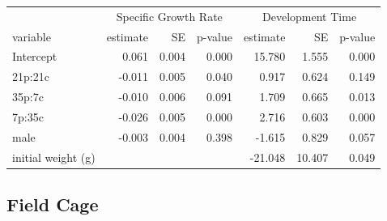 \documentclass[
]{article}
\begin{document}
\begin{tbl}

\begin{minipage}{\linewidth}

\begingroup
\fontsize{12.0pt}{14.4pt}\selectfont
\begin{longtable*}{lrrrrrr}
\toprule
 &  &  \\ 
\cmidrule(lr){2-4} \cmidrule(lr){5-7}
variable & estimate & SE & p-value & estimate & SE & p-value \\ 
\midrule\addlinespace[2.5pt]
Intercept & 0.061 & 0.004 & 0.000 & 15.780 & 1.555 & 0.000 \\ 
21p:21c & -0.011 & 0.005 & 0.040 & 0.917 & 0.624 & 0.149 \\ 
35p:7c & -0.010 & 0.006 & 0.091 & 1.709 & 0.665 & 0.013 \\ 
7p:35c & -0.026 & 0.005 & 0.000 & 2.716 & 0.603 & 0.000 \\ 
male & -0.003 & 0.004 & 0.398 & -1.615 & 0.829 & 0.057 \\ 
initial weight (g) &  &  &  & -21.048 & 10.407 & 0.049 \\ 
\bottomrule
\end{longtable*}
\endgroup

\end{minipage}%

\caption{\label{tbl-field-population-no-choice-model}\emph{C.
terminifera} physiological performance (specific growth rate and
development time) when constrained to specific diets with varying
protein and carbohydrate content. SE: standard error. Posthoc
comparisons for both physiological performance metrics can be seen in
Supplementary Table~\ref{supptbl-field-population-no-choice-experiment-phys-post-hoc}.}

\end{tbl}%

\subsection{Field Cage}\label{field-cage-1}
\end{document}
